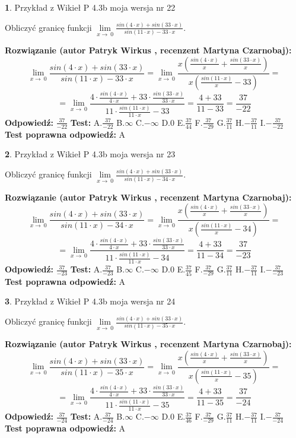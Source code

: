 \documentclass[12pt, a4paper]{article}
\theoremstyle{definition} %
\newtheorem{zad}{}
\newcommand{\zadStart}[1]{\begin{zad}#1\newline}
\newcommand{\zadStop}{\end{zad}}
\newcommand{\rozwStart}[2]{\noindent \textbf{Rozwiązanie (autor #1 , recenzent #2): }\newline}
\newcommand{\rozwStop}{\newline}
\newcommand{\odpStart}{\noindent \textbf{Odpowiedź:}\newline}
\newcommand{\odpStop}{\newline}
\newcommand{\testStart}{\noindent \textbf{Test:}\newline}
\newcommand{\testStop}{\newline}
\newcommand{\kluczStart}{\noindent \textbf{Test poprawna odpowiedź:}\newline}
\newcommand{\kluczStop}{\newline}
\begin{document}
\zadStart{Przykład z Wikieł P 4.3b moja wersja nr 22}


Obliczyć granicę funkcji $\lim\limits_{x\to\ 0}\frac{sin(4 \cdot x)+sin(33 \cdot x)}{sin(11 \cdot x)-33 \cdot x}$.
\zadStop
\rozwStart{Patryk Wirkus}{Martyna Czarnobaj}
$$\lim\limits_{x\to\ 0}\frac{sin(4 \cdot x)+sin(33 \cdot x)}{sin(11 \cdot x)-33 \cdot x}=\lim\limits_{x\to\ 0}\frac{x(\frac{sin(4 \cdot x)}{x}+\frac{sin(33 \cdot x)}{x})}{x(\frac{sin(11 \cdot x)}{x}-33)}=$$
$$=\lim\limits_{x\to\ 0}\frac{4 \cdot \frac{sin(4 \cdot x)}{4 \cdot x}+33 \cdot \frac{sin(33 \cdot x)}{33 \cdot x}}{11 \cdot \frac{sin(11 \cdot x)}{11 \cdot x}-33}=\frac{4+33}{11-33} = \frac{37}{-22}$$
\rozwStop
\odpStart
$\frac{37}{-22}$
\odpStop
\testStart
A.$\frac{37}{-22}$
B.$\infty$
C.$-\infty$
D.$0$
E.$\frac{37}{44}$
F.$\frac{37}{-29}$
G.$\frac{37}{11}$
H.$-\frac{37}{11}$
I.$-\frac{37}{-22}$
\testStop
\kluczStart
A
\kluczStop



\zadStart{Przykład z Wikieł P 4.3b moja wersja nr 23}


Obliczyć granicę funkcji $\lim\limits_{x\to\ 0}\frac{sin(4 \cdot x)+sin(33 \cdot x)}{sin(11 \cdot x)-34 \cdot x}$.
\zadStop
\rozwStart{Patryk Wirkus}{Martyna Czarnobaj}
$$\lim\limits_{x\to\ 0}\frac{sin(4 \cdot x)+sin(33 \cdot x)}{sin(11 \cdot x)-34 \cdot x}=\lim\limits_{x\to\ 0}\frac{x(\frac{sin(4 \cdot x)}{x}+\frac{sin(33 \cdot x)}{x})}{x(\frac{sin(11 \cdot x)}{x}-34)}=$$
$$=\lim\limits_{x\to\ 0}\frac{4 \cdot \frac{sin(4 \cdot x)}{4 \cdot x}+33 \cdot \frac{sin(33 \cdot x)}{33 \cdot x}}{11 \cdot \frac{sin(11 \cdot x)}{11 \cdot x}-34}=\frac{4+33}{11-34} = \frac{37}{-23}$$
\rozwStop
\odpStart
$\frac{37}{-23}$
\odpStop
\testStart
A.$\frac{37}{-23}$
B.$\infty$
C.$-\infty$
D.$0$
E.$\frac{37}{45}$
F.$\frac{37}{-29}$
G.$\frac{37}{11}$
H.$-\frac{37}{11}$
I.$-\frac{37}{-23}$
\testStop
\kluczStart
A
\kluczStop



\zadStart{Przykład z Wikieł P 4.3b moja wersja nr 24}


Obliczyć granicę funkcji $\lim\limits_{x\to\ 0}\frac{sin(4 \cdot x)+sin(33 \cdot x)}{sin(11 \cdot x)-35 \cdot x}$.
\zadStop
\rozwStart{Patryk Wirkus}{Martyna Czarnobaj}
$$\lim\limits_{x\to\ 0}\frac{sin(4 \cdot x)+sin(33 \cdot x)}{sin(11 \cdot x)-35 \cdot x}=\lim\limits_{x\to\ 0}\frac{x(\frac{sin(4 \cdot x)}{x}+\frac{sin(33 \cdot x)}{x})}{x(\frac{sin(11 \cdot x)}{x}-35)}=$$
$$=\lim\limits_{x\to\ 0}\frac{4 \cdot \frac{sin(4 \cdot x)}{4 \cdot x}+33 \cdot \frac{sin(33 \cdot x)}{33 \cdot x}}{11 \cdot \frac{sin(11 \cdot x)}{11 \cdot x}-35}=\frac{4+33}{11-35} = \frac{37}{-24}$$
\rozwStop
\odpStart
$\frac{37}{-24}$
\odpStop
\testStart
A.$\frac{37}{-24}$
B.$\infty$
C.$-\infty$
D.$0$
E.$\frac{37}{46}$
F.$\frac{37}{-29}$
G.$\frac{37}{11}$
H.$-\frac{37}{11}$
I.$-\frac{37}{-24}$
\testStop
\kluczStart
A
\kluczStop
\end{document}
